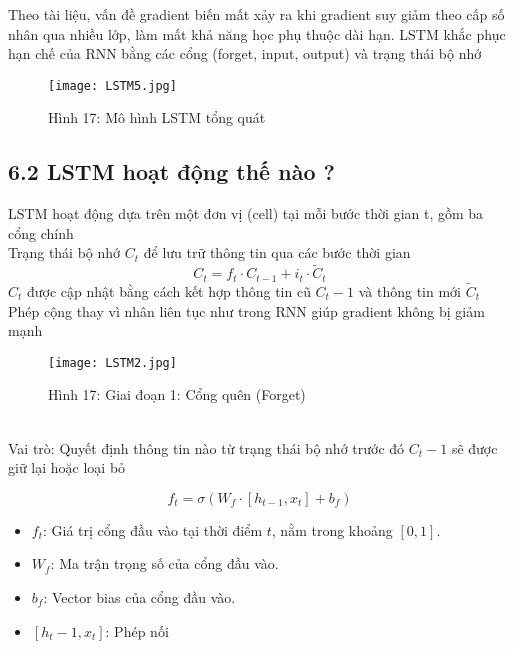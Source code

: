\documentclass[a4paper,13pt]{article}
\begin{document}
Theo tài liệu, vấn đề gradient biến mất xảy ra khi gradient suy giảm theo cấp số nhân qua nhiều lớp, làm mất khả năng học phụ thuộc dài hạn. LSTM khắc phục hạn chế của RNN bằng các cổng (forget, input, output) và trạng thái bộ nhớ

\begin{figure}[htbp]
    \centering
    \texttt{[image: LSTM5.jpg]}
    \caption*{Hình 17: Mô hình LSTM tổng quát\cite{key10} }
    \label{fig:model}
\end{figure}

\clearpage
\subsection{6.2 LSTM hoạt động thế nào ?}
LSTM hoạt động dựa trên một đơn vị (cell) tại mỗi bước thời gian t, gồm ba cổng chính \\
Trạng thái bộ nhớ \( {C}_t \) để lưu trữ thông tin qua các bước thời gian
\begin{equation}
C_t = f_t \cdot C_{t-1} + i_t \cdot \tilde{C}_t \tag{12}\label{eq:cell_state_update}
\end{equation}
\( {C}_t \) được cập nhật bằng cách kết hợp thông tin cũ  \( {C}_t-1 \) và thông tin mới \( \tilde{C}_t \) \\
Phép cộng thay vì nhân liên tục như trong RNN giúp gradient không bị giảm mạnh
\begin{figure}[htbp]
    \centering
    \texttt{[image: LSTM2.jpg]}
    \caption*{Hình 17: Giai đoạn 1: Cổng quên (Forget)\cite{key10} }
    \label{fig:model}
\end{figure}\\
Vai trò: Quyết định thông tin nào từ trạng thái bộ nhớ trước đó \( {C}_t-1 \) sẽ được giữ lại hoặc loại bỏ


\begin{equation}
f_t = \sigma(W_f \cdot [h_{t-1}, x_t] + b_f) \label{eq:input_gate} \tag{13}
\end{equation}
\begin{itemize}
    \item \( f_t \): Giá trị cổng đầu vào tại thời điểm \( t \), nằm trong khoảng \([0, 1]\).
    \item \( W_f \): Ma trận trọng số của cổng đầu vào.
    \item \( b_f \): Vector bias của cổng đầu vào.
    \item \( [h_t-1, x_t] \): Phép nối
\end{itemize}
\end{document}
